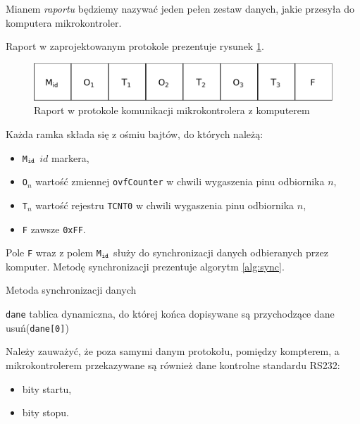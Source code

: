 Mianem \emph{raportu} będziemy nazywać jeden pełen zestaw danych, jakie przesyła do komputera mikrokontroler.

Raport w zaprojektowanym protokole prezentuje rysunek \ref{fig:protocol}.

\begin{figure}
 \includegraphics[width=\textwidth]{gfx/diagramy/protokol.pdf}
 \caption[Schemat raportu]{Raport w protokole komunikacji mikrokontrolera z komputerem}
 \label{fig:protocol}
\end{figure}

Każda ramka składa się z ośmiu bajtów, do których należą:
\begin{itemize}
 \item \texttt{M$_\textrm{\texttt{id}}$} \ppauza $id$ markera,
 \item \texttt{O$_n$} \ppauza wartość zmiennej \texttt{ovfCounter} w chwili wygaszenia pinu odbiornika $n$,
 \item \texttt{T$_n$} \ppauza wartość rejestru \texttt{TCNT0} w chwili wygaszenia pinu odbiornika $n$,
 \item \texttt{F} \ppauza zawsze \texttt{0xFF}.
\end{itemize}

Pole \texttt{F} wraz z polem \texttt{M$_\textrm{\texttt{id}}$} służy do synchronizacji danych odbieranych przez komputer. Metodę synchronizacji prezentuje algorytm \ref{alg:sync}.

\begin{algorithm}
\caption{Metoda synchronizacji danych}
\label{alg:sync}
\begin{algorithmic}[1]
  \REQUIRE \texttt{dane} \ppauza tablica dynamiczna, do której końca dopisywane są przychodzące dane
      \STATE usuń(\texttt{dane[0]})
    \ENDWHILE
  \ENDWHILE
\end{algorithmic}
\end{algorithm}

Należy zauważyć, że poza samymi danym protokołu, pomiędzy kompterem, a mikrokontrolerem przekazywane są również dane kontrolne standardu RS232:
\begin{itemize}
  \item bity startu,
  \item bity stopu.
\end{itemize}

